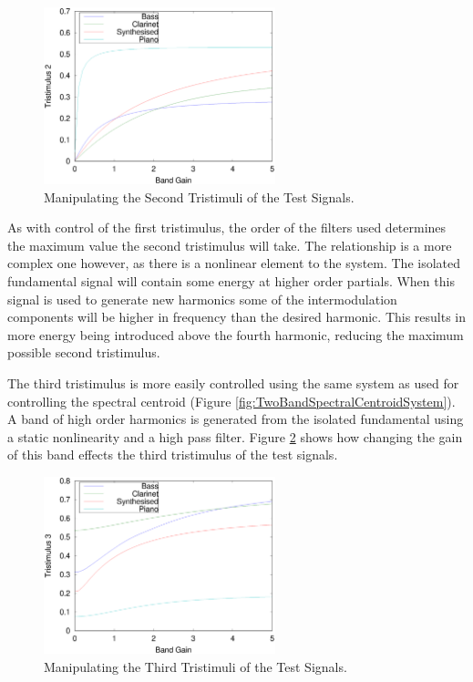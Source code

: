 			\begin{figure}[h!]
				\centering
				\includegraphics[width=0.6\textwidth]{chapter6/Images/MoveTristimulus2.eps}
				\caption{Manipulating the Second Tristimuli of the Test Signals.}
				\label{fig:MoveTristimulus2}
			\end{figure}

			As with control of the first tristimulus, the order of the filters used determines the maximum
			value the second tristimulus will take. The relationship is a more complex one however, as there is
			a nonlinear element to the system. The isolated fundamental signal will contain some energy at
			higher order partials.  When this signal is used to generate new harmonics some of the
			intermodulation components will be higher in frequency than the desired harmonic. This results in
			more energy being introduced above the fourth harmonic, reducing the maximum possible second
			tristimulus.

			The third tristimulus is more easily controlled using the same system as used for controlling the
			spectral centroid (Figure \ref{fig:TwoBandSpectralCentroidSystem}). A band of high order harmonics
			is generated from the isolated fundamental using a static nonlinearity and a high pass filter.
			Figure \ref{fig:MoveTristimulus3} shows how changing the gain of this band effects the third
			tristimulus of the test signals.

			\begin{figure}[h!]
				\centering
				\includegraphics[width=0.6\textwidth]{chapter6/Images/MoveTristimulus3.eps}
				\caption{Manipulating the Third Tristimuli of the Test Signals.}
				\label{fig:MoveTristimulus3}
			\end{figure}

